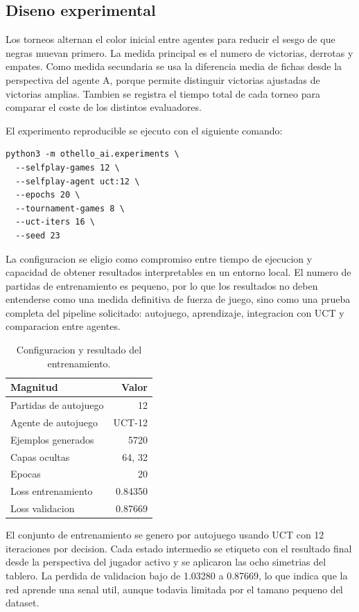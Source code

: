 \documentclass[conference,a4paper]{IEEEtran}
\begin{document}
\subsection{Diseno experimental}

Los torneos alternan el color inicial entre agentes para reducir el sesgo de que
negras muevan primero. La medida principal es el numero de victorias, derrotas y
empates. Como medida secundaria se usa la diferencia media de fichas desde la
perspectiva del agente A, porque permite distinguir victorias ajustadas de
victorias amplias. Tambien se registra el tiempo total de cada torneo para
comparar el coste de los distintos evaluadores.

El experimento reproducible se ejecuto con el siguiente comando:

\begin{verbatim}
python3 -m othello_ai.experiments \
  --selfplay-games 12 \
  --selfplay-agent uct:12 \
  --epochs 20 \
  --tournament-games 8 \
  --uct-iters 16 \
  --seed 23
\end{verbatim}

La configuracion se eligio como compromiso entre tiempo de ejecucion y
capacidad de obtener resultados interpretables en un entorno local. El numero de
partidas de entrenamiento es pequeno, por lo que los resultados no deben
entenderse como una medida definitiva de fuerza de juego, sino como una prueba
completa del pipeline solicitado: autojuego, aprendizaje, integracion con UCT y
comparacion entre agentes.

\begin{table}[h]
\centering
\caption{Configuracion y resultado del entrenamiento.}
\label{tab:entrenamiento}
\begin{tabular}{lr}
\toprule
Magnitud & Valor \\
\midrule
Partidas de autojuego & 12 \\
Agente de autojuego & UCT-12 \\
Ejemplos generados & 5720 \\
Capas ocultas & 64, 32 \\
Epocas & 20 \\
Loss entrenamiento & 0.84350 \\
Loss validacion & 0.87669 \\
\bottomrule
\end{tabular}
\end{table}

El conjunto de entrenamiento se genero por autojuego usando UCT con 12
iteraciones por decision. Cada estado intermedio se etiqueto con el resultado
final desde la perspectiva del jugador activo y se aplicaron las ocho simetrias
del tablero. La perdida de validacion bajo de 1.03280 a 0.87669, lo que indica
que la red aprende una senal util, aunque todavia limitada por el tamano pequeno
del dataset.
\end{document}
